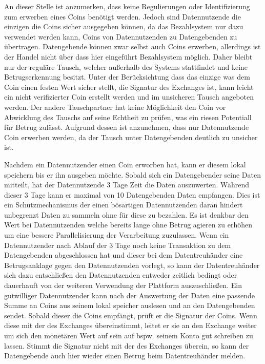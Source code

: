 \documentclass[11pt,a4paper]{scrreprt}
\begin{document}
An dieser Stelle ist anzumerken, dass keine Regulierungen oder Identifizierung zum erwerben eines Coins benötigt werden. Jedoch sind Datennutzende die einzigen die Coins sicher ausgegeben können, da das Bezahlsystem nur dazu verwendet werden kann, Coins von Datennutzenden zu Datengebenden zu übertragen. Datengebende können zwar selbst auch Coins erwerben, allerdings ist der Handel nicht über dass hier eingeführt Bezahlsystem möglich. Daher bleibt nur der reguläre Tausch, welcher außerhalb des Systems stattfindet und keine Betrugserkennung besitzt. Unter der Berücksichtung dass das einzige was dem Coin einen festen Wert sicher stellt, die Signatur des Exchanges ist, kann leicht ein nicht verifizierter Coin erstellt werden und im unsicheren Tausch angeboten werden. Der andere Tauschpartner hat keine Möglichkeit den Coin vor Abwicklung des Tauschs auf seine Echtheit zu prüfen, was ein riesen Potentiall für Betrug zulässt. Aufgrund dessen ist anzunehmen, dass nur Datennutzende Coin erwerben werden, da der Tausch unter Datengebenden deutlich zu unsicher ist.

Nachdem ein Datennutzender einen Coin erworben hat, kann er diesem lokal speichern bis er ihn ausgeben möchte. Sobald sich ein Datengebender seine Daten mitteilt, hat der Datennutzende 3 Tage Zeit die Daten auszuwerten. Während dieser 3 Tage kann er maximal von 10 Datengebenden Daten empfangen. Dies ist ein Schutzmechanismus der einen bösartigen Datennutzenden daran hindert unbegrenzt Daten zu sammeln ohne für diese zu bezahlen. Es ist denkbar den Wert bei Datennutzenden welche bereits lange ohne Betrug agieren zu erhöhen um eine bessere Parallelisierung der Verarbeitung zuzulassen. Wenn ein Datennutzender nach Ablauf der 3 Tage noch keine Transaktion zu dem Datengebenden abgeschlossen hat und dieser bei dem Datentreuhänder eine Betrugsanklage gegen den Datennutzenden vorlegt, so kann der Datentreuhänder sich dazu entschließen den Datennutzenden entweder zeitlich bedingt oder dauerhauft von der weiteren Verwendung der Plattform auszuschließen. Ein gutwilliger Datennutzender kann nach der Auswertung der Daten eine passende Summe an Coins aus seinem lokal speicher auslesen und an den Datengebenden sendet. Sobald dieser die Coins empfängt, prüft er die Signatur der Coins. Wenn diese mit der des Exchanges übereinstimmt, leitet er sie an den Exchange weiter um sich den monetären Wert auf sein auf bspw.  seinem Konto gut schreiben zu lassen. Stimmt die Signatur nicht mit der des Exchanges überein, so kann der Datengebende auch hier wieder einen Betrug beim Datentreuhänder melden.
\end{document}
